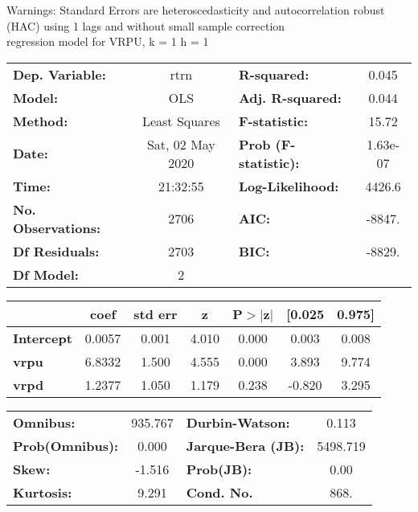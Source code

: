 Warnings: \newline
 [1] Standard Errors are heteroscedasticity and autocorrelation robust (HAC) using 1 lags and without small sample correction\\ 

regression model for VRPU, k = 1 h = 1\begin{center}
\begin{tabular}{lclc}
\toprule
\textbf{Dep. Variable:}    &       rtrn       & \textbf{  R-squared:         } &     0.045   \\
\textbf{Model:}            &       OLS        & \textbf{  Adj. R-squared:    } &     0.044   \\
\textbf{Method:}           &  Least Squares   & \textbf{  F-statistic:       } &     15.72   \\
\textbf{Date:}             & Sat, 02 May 2020 & \textbf{  Prob (F-statistic):} &  1.63e-07   \\
\textbf{Time:}             &     21:32:55     & \textbf{  Log-Likelihood:    } &    4426.6   \\
\textbf{No. Observations:} &        2706      & \textbf{  AIC:               } &    -8847.   \\
\textbf{Df Residuals:}     &        2703      & \textbf{  BIC:               } &    -8829.   \\
\textbf{Df Model:}         &           2      & \textbf{                     } &             \\
\bottomrule
\end{tabular}
\begin{tabular}{lcccccc}
                   & \textbf{coef} & \textbf{std err} & \textbf{z} & \textbf{P$> |$z$|$} & \textbf{[0.025} & \textbf{0.975]}  \\
\midrule
\textbf{Intercept} &       0.0057  &        0.001     &     4.010  &         0.000        &        0.003    &        0.008     \\
\textbf{vrpu}      &       6.8332  &        1.500     &     4.555  &         0.000        &        3.893    &        9.774     \\
\textbf{vrpd}      &       1.2377  &        1.050     &     1.179  &         0.238        &       -0.820    &        3.295     \\
\bottomrule
\end{tabular}
\begin{tabular}{lclc}
\textbf{Omnibus:}       & 935.767 & \textbf{  Durbin-Watson:     } &    0.113  \\
\textbf{Prob(Omnibus):} &   0.000 & \textbf{  Jarque-Bera (JB):  } & 5498.719  \\
\textbf{Skew:}          &  -1.516 & \textbf{  Prob(JB):          } &     0.00  \\
\textbf{Kurtosis:}      &   9.291 & \textbf{  Cond. No.          } &     868.  \\
\bottomrule
\end{tabular}
\end{center}

